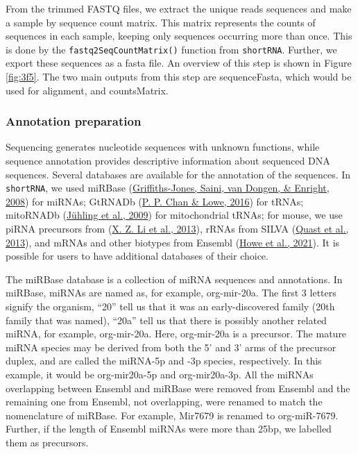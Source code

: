 \documentclass[12pt,twoside]{reedthesis}
\begin{document}
From the trimmed FASTQ files, we extract the unique reads sequences and
make a sample by sequence count matrix. This matrix represents the
counts of sequences in each sample, keeping only sequences occurring
more than once. This is done by the \texttt{fastq2SeqCountMatrix()} function
from \texttt{shortRNA}. Further, we export these sequences as a fasta file. An
overview of this step is shown in Figure \ref{fig:3f5}. The two main
outputs from this step are sequenceFasta, which would be used for
alignment, and countsMatrix.

\hypertarget{annotation-preparation}{%
\subsubsection{Annotation preparation}\label{annotation-preparation}}

Sequencing generates nucleotide sequences with unknown functions, while
sequence annotation provides descriptive information about sequenced DNA
sequences. Several databases are available for the annotation of the
sequences. In \texttt{shortRNA}, we used miRBase (\protect\hyperlink{ref-griffiths-jones2008}{Griffiths-Jones, Saini, van Dongen, \& Enright, 2008}) for
miRNAs; GtRNADb (\protect\hyperlink{ref-chan2016}{P. P. Chan \& Lowe, 2016}) for tRNAs; mitoRNADb (\protect\hyperlink{ref-juxfchling2009}{Jühling et al., 2009}) for
mitochondrial tRNAs; for mouse, we use piRNA precursors from (\protect\hyperlink{ref-li2013}{X. Z. Li et al., 2013}),
rRNAs from SILVA (\protect\hyperlink{ref-quast2013}{Quast et al., 2013}), and mRNAs and other biotypes from Ensembl
(\protect\hyperlink{ref-howe2021}{Howe et al., 2021}). It is possible for users to have additional databases of
their choice.

The miRBase database is a collection of miRNA sequences and annotations.
In miRBase, miRNAs are named as, for example, org-mir-20a. The first 3
letters signify the organism, ``20'' tell us that it was an
early-discovered family (20th family that was named), ``20a'' tell us that
there is possibly another related miRNA, for example, org-mir-20a. Here,
org-mir-20a is a precursor. The mature miRNA species may be derived from
both the 5' and 3' arms of the precursor duplex, and are called the
miRNA-5p and -3p species, respectively. In this example, it would be
org-mir20a-5p and org-mir20a-3p. All the miRNAs overlapping between
Ensembl and miRBase were removed from Ensembl and the remaining one from
Ensembl, not overlapping, were renamed to match the nomenclature of
miRBase. For example, Mir7679 is renamed to org-miR-7679. Further, if
the length of Ensembl miRNAs were more than 25bp, we labelled them as
precursors.
\end{document}

